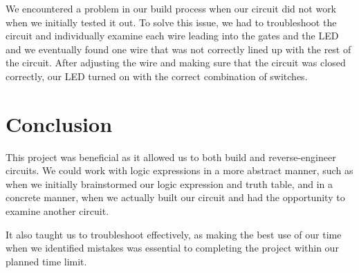 \documentclass{article}
\begin{document}
We encountered a problem in our build process when our circuit did not work when we initially tested it out. To solve this issue, we had to troubleshoot the circuit and individually examine each wire leading into the gates and the LED and we eventually found one wire that was not correctly lined up with the rest of the circuit. After adjusting the wire and making sure that the circuit was closed correctly, our LED turned on with the correct combination of switches. 

\section{Conclusion}

This project was beneficial as it allowed us to both build and reverse-engineer circuits. We could work with logic expressions in a more abstract manner, such as when we initially brainstormed our logic expression and truth table, and in a concrete manner, when we actually built our circuit and had the opportunity to examine another circuit.

It also taught us to troubleshoot effectively, as making the best use of our time when we identified mistakes was essential to completing the project within our planned time limit.
\end{document}
